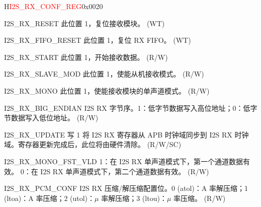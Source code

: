 \begin{register}{H}{\textcolor{red}{I2S\_RX\_CONF\_REG}}{0x{}0020}\label{regdesc:I2SRXCONFREG}
%
%
%
%
%
%
%
%
%
%
%
%
%
%
%
%
%
%
%
%
%
%
\regnewline%
\begin{regdesc}\begin{reglist}
\label{fielddesc:I2SRXRESET}\item [I2S\_RX\_RESET] 此位置 1，复位接收模块。 (WT)
\label{fielddesc:I2SRXFIFORESET}\item [I2S\_RX\_FIFO\_RESET] 此位置 1，复位 RX FIFO。 (WT)
\label{fielddesc:I2SRXSTART}\item [I2S\_RX\_START] 此位置 1，开始接收数据。 (R/W)
\label{fielddesc:I2SRXSLAVEMOD}\item [I2S\_RX\_SLAVE\_MOD] 此位置 1，使能从机接收模式。 (R/W)
\label{fielddesc:I2SRXMONO}\item [I2S\_RX\_MONO] 此位置 1，使能接收模块的单声道模式。 (R/W)
\label{fielddesc:I2SRXBIGENDIAN}\item [I2S\_RX\_BIG\_ENDIAN] I2S RX 字节序。1：低字节数据写入高位地址；0：低字节数据写入低位地址。 (R/W)
\label{fielddesc:I2SRXUPDATE}\item [I2S\_RX\_UPDATE] 写 1 将 I2S RX 寄存器从 APB 时钟域同步到 I2S RX 时钟域。寄存器更新完成后，此位将由硬件清除。 (R/W/SC)
\label{fielddesc:I2SRXMONOFSTVLD}\item [I2S\_RX\_MONO\_FST\_VLD] 1：在 I2S RX 单声道模式下，第一个通道数据有效。   0：在 I2S RX 单声道模式下，第二个通道数据有效。 (R/W)
\label{fielddesc:I2SRXPCMCONF}\item [I2S\_RX\_PCM\_CONF] I2S RX 压缩/解压缩配置位。0 (atol)：A 率解压缩；1 (ltoa)：A 率压缩；2 (utol)：$\mu$ 率解压缩；3 (ltou)：$\mu$ 率压缩。 (R/W)

\end{reglist}
\end{regdesc}
\end{register}
